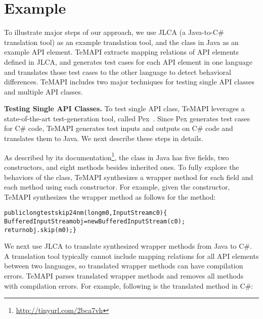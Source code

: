 \section{Example}
\label{sec:example}

To illustrate major steps of our approach, we use JLCA (a Java-to-C\# translation tool) as an example translation tool, and the  class in Java as an example API element. TeMAPI extracts mapping relations of API elements defined in JLCA, and generates test cases for each API element in one language and translates those test cases to the other language to detect behavioral differences. TeMAPI includes two major techniques for testing single API classes and multiple API classes.

\textbf{Testing Single API Classes.} To test single API class, TeMAPI leverages a state-of-the-art test-generation tool, called Pex~\cite{tillmann2008pex}. Since Pex generates test cases for C\# code, TeMAPI generates test inputs and outputs on C\# code and translates them to Java. We next describe these steps in details.

As described by its documentation\footnote{\url{http://tinyurl.com/2bca7vh}}, the  class in Java has five fields, two constructors, and eight methods besides inherited ones. To fully explore the behaviors of the class, TeMAPI synthesizes a wrapper method for each field and each method using each constructor. For example, given the  constructor, TeMAPI synthesizes the wrapper method as follows for the  method:

\begin{CodeOut}\vspace*{-1ex}
\begin{alltt}
public long testskip24nm(long m0,InputStream c0)\{
  BufferedInputStream obj = new BufferedInputStream(c0);
  return obj.skip(m0);\}
\end{alltt}
\end{CodeOut}\vspace*{-2ex}

We next use JLCA to translate synthesized wrapper methods from Java to C\#. A translation tool typically cannot include mapping relations for all API elements between two languages, so translated wrapper methods can have compilation errors. TeMAPI parses translated wrapper methods and removes all methods with compilation errors. For example, following is the translated  method in C\#:
\vspace*{-2ex}

